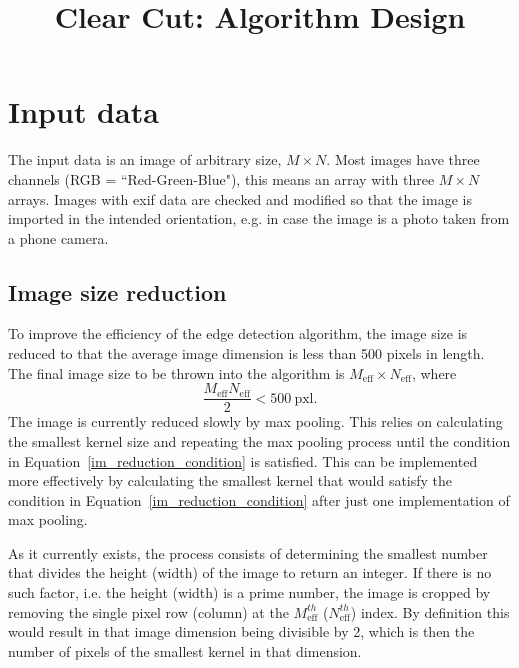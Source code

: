 \documentclass[11pt]{article}
\begin{document}
\thispagestyle{empty}

\title{Clear Cut: Algorithm Design}
\maketitle
\tableofcontents

\newpage
\section{Input data}
The input data is an image of arbitrary size, $M \times N$. Most images have three channels (RGB = ``Red-Green-Blue"), this means an array with three $M \times N$ arrays. Images with exif data are checked and modified so that the image is imported in the intended orientation, e.g. in case the image is a photo taken from a phone camera.

\subsection{Image size reduction}
To improve the efficiency of the edge detection algorithm, the image size is reduced to that the average image dimension is less than 500 pixels in length. The final image size to be thrown into the algorithm is $M_{\text{eff}} \times N_{\text{eff}}$, where
\begin{equation}
\dfrac{M_{\text{eff}} N_{\text{eff}}}{2}<500~\text{pxl} \text{.}
\label{im_reduction_condition}
\end{equation}
The image is currently reduced slowly by max pooling. This relies on calculating the smallest kernel size and repeating the max pooling process until the condition in Equation~\ref{im_reduction_condition} is satisfied. This can be implemented more effectively by calculating the smallest kernel that would satisfy the condition in Equation~\ref{im_reduction_condition} after just one implementation of max pooling.

As it currently exists, the process consists of determining the smallest number that divides the height (width) of the image to return an integer. If there is no such factor, i.e. the height (width) is a prime number, the image is cropped by removing the single pixel row (column) at the $M_{\text{eff}}^{th}$ ($N_{\text{eff}}^{th}$) index. By definition this would result in that image dimension being divisible by 2, which is then the number of pixels of the smallest kernel in that dimension.
\end{document}
